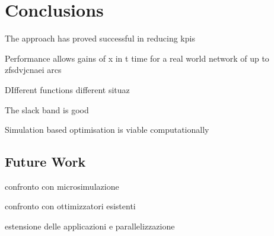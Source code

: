 \chapter{Conclusions} \label{c:conclusions}

The approach has proved successful in reducing kpis

Performance allows gains of x in t time for a real world network of up to zfsdvjcnaei arcs

DIfferent functions different situaz

The slack band is good

Simulation based optimisation is viable computationally


\section{Future Work}
confronto con microsimulazione

confronto con ottimizzatori esistenti

estensione delle applicazioni e parallelizzazione